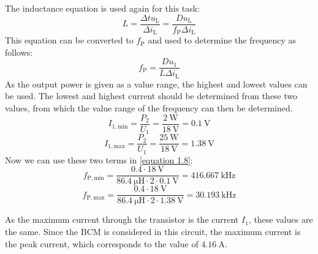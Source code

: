  \begin{solutionblock}
     The inductance equation is used again for this task:
     \begin{equation}
        L = \frac{\Delta t  u_{\mathrm{L}}}{\Delta i_{\mathrm{L}}}= \frac{D u_{\mathrm{L}}}{f_\mathrm{P}\Delta i_{\mathrm{L}}}
     \end{equation}
     This equation can be converted to $f_\mathrm{P}$ and used to determine the frequency as follows:
     \begin{equation}
        f_\mathrm{P} = \frac{Du_{\mathrm{1}}}{L\Delta i_{\mathrm{L}}} \label{equation 1.8}
     \end{equation}
     As the output power is given as a value range, the highest and lowest values can be used. The lowest and highest current should be determined from these two values, from which the value range of the frequency can then be determined.
     \begin{equation}
        I_\mathrm{1,min}= \frac{P_\mathrm{2}}{U_\mathrm{1}}=\frac{\SI{2}{\watt}}{\SI{18}{\volt}}=\SI{0.1}{\volt}
     \end{equation}
     \begin{equation}
        I_\mathrm{1,max}= \frac{P_\mathrm{2}}{U_\mathrm{1}}=\frac{\SI{25}{\watt}}{\SI{18}{\volt}}=\SI{1.38}{\volt}
     \end{equation}
     Now we can use these two terms in \ref{equation 1.8}:
     \begin{equation}
        f_\mathrm{P,min}=\frac{0.4\cdot\SI{18}{\volt}}{\SI{86.4}{\micro\henry}\cdot 2\cdot \SI{0.1}{\volt}}=\SI{416.667}{\kilo \hertz}
     \end{equation}
     \begin{equation}
        f_\mathrm{P,max}=\frac{0.4\cdot\SI{18}{\volt}}{\SI{86.4}{\micro\henry}\cdot 2\cdot \SI{1.38}{\volt}}=\SI{30.193}{\kilo \hertz}
     \end{equation}
 \end{solutionblock}

 \begin{solutionblock}
    As the maximum current through the transistor is the current $I_1$, these values are the same. Since the BCM is considered in this circuit, the maximum current is the peak current, which corresponds to the value of $\SI{4.16}{\ampere}$.
 \end{solutionblock}


